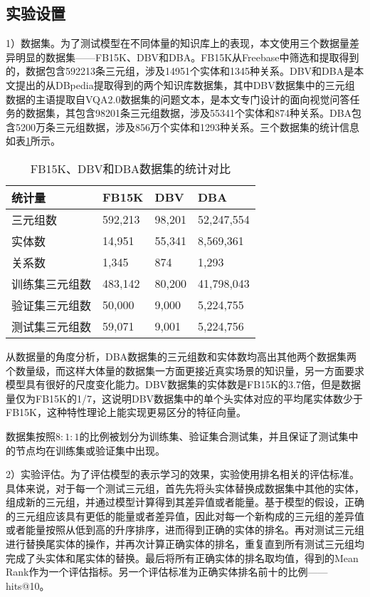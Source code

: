 \subsection{实验设置}

1）数据集。为了测试模型在不同体量的知识库上的表现，本文使用三个数据量差异明显的数据集——FB15K、DBV和DBA。FB15K从Freebase中筛选和提取得到的，数据包含592213条三元组，涉及14951个实体和1345种关系。DBV和DBA是本文提出的从DBpedia提取得到的两个知识库数据集，其中DBV数据集中的三元组数据的主语提取自VQA2.0数据集的问题文本，是本文专门设计的面向视觉问答任务的数据集，其包含98201条三元组数据，涉及55341个实体和874种关系。DBA包含5200万条三元组数据，涉及856万个实体和1293种关系。三个数据集的统计信息如表\ref{3kb}所示。
\begin{table}[H]
\centering
\caption{FB15K、DBV和DBA数据集的统计对比}
\begin{tabular}{llll}
\toprule
统计量 & FB15K & DBV & DBA \\
\midrule
三元组数 & 592,213 & 98,201 & 52,247,554 \\
实体数 & 14,951 &  55,341 &  8,569,361 \\
关系数 & 1,345 & 874 & 1,293 \\
训练集三元组数 & 483,142 & 80,200 & 41,798,043\\
验证集三元组数 & 50,000 & 9,000 & 5,224,755\\
测试集三元组数 & 59,071 & 9,001 & 5,224,756\\
\bottomrule
\end{tabular}
\label{3kb}
\end{table}

从数据量的角度分析，DBA数据集的三元组数和实体数均高出其他两个数据集两个数量级，而这样大体量的数据集一方面更接近真实场景的知识量，另一方面要求模型具有很好的尺度变化能力。DBV数据集的实体数是FB15K的3.7倍，但是数据量仅为FB15K的1/7，这说明DBV数据集中的单个头实体对应的平均尾实体数少于FB15K，这种特性理论上能实现更易区分的特征向量。

数据集按照$8:1:1$的比例被划分为训练集、验证集合测试集，并且保证了测试集中的节点均在训练集或验证集中出现。

2）实验评估。为了评估模型的表示学习的效果，实验使用排名相关的评估标准。具体来说，对于每一个测试三元组，首先先将头实体替换成数据集中其他的实体，组成新的三元组，并通过模型计算得到其差异值或者能量。基于模型的假设，正确的三元组应该具有更低的能量或者差异值，因此对每一个新构成的三元组的差异值或者能量按照从低到高的升序排序，进而得到正确的实体的排名。再对测试三元组进行替换尾实体的操作，并再次计算正确实体的排名，重复直到所有测试三元组均完成了头实体和尾实体的替换。最后将所有正确实体的排名取均值，得到的Mean Rank作为一个评估指标。另一个评估标准为正确实体排名前十的比例——hits@10。

